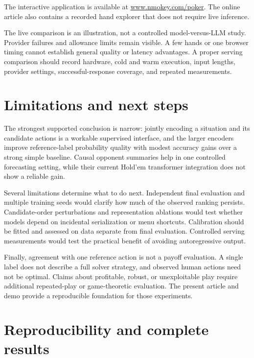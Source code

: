 \documentclass[
  11pt,
  letterpaper,
]{article}
\begin{document}
The interactive application is available at
\href{https://www.nmokey.com/poker/}{www.nmokey.com/poker}. The online
article also contains a recorded hand explorer that does not require
live inference.

The live comparison is an illustration, not a controlled
model-versus-LLM study. Provider failures and allowance limits remain
visible. A few hands or one browser timing cannot establish general
quality or latency advantages. A proper serving comparison should record
hardware, cold and warm execution, input lengths, provider settings,
successful-response coverage, and repeated measurements.

\section{Limitations and next steps}\label{limitations-and-next-steps}

The strongest supported conclusion is narrow: jointly encoding a
situation and its candidate actions is a workable supervised interface,
and the larger encoders improve reference-label probability quality with
modest accuracy gains over a strong simple baseline. Causal opponent
summaries help in one controlled forecasting setting, while their
current Hold'em transformer integration does not show a reliable gain.

Several limitations determine what to do next. Independent final
evaluation and multiple training seeds would clarify how much of the
observed ranking persists. Candidate-order perturbations and
representation ablations would test whether models depend on incidental
serialization or menu shortcuts. Calibration should be fitted and
assessed on data separate from final evaluation. Controlled serving
measurements would test the practical benefit of avoiding autoregressive
output.

Finally, agreement with one reference action is not a payoff evaluation.
A single label does not describe a full solver strategy, and observed
human actions need not be optimal. Claims about profitable, robust, or
unexploitable play require additional repeated-play or game-theoretic
evaluation. The present article and demo provide a reproducible
foundation for those experiments.

\section{Reproducibility and complete
results}\label{reproducibility-and-complete-results}
\end{document}
